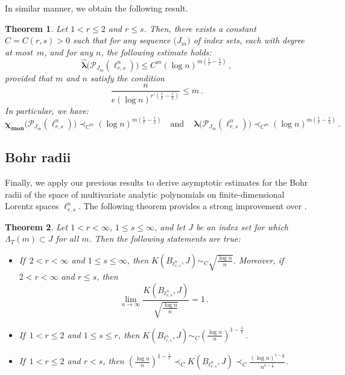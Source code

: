 \documentclass[12pt]{amsart}
\numberwithin{subsection}{section}
\newtheorem{theorem}{Theorem}[section]
\theoremstyle{definition}
\theoremstyle{remark}
\DeclareMathOperator{\mon}{mon}
\newcommand{\chimon}{\chi_{\mon}}
\begin{document}
In similar manner, we obtain the following result.


\begin{theorem} \label{proj lorentz s>r, big m}
Let $1 < r \leq 2$ and $r \leq s$. 
Then, there exists a constant $C=C(r, s)>0$ such that for any sequence $\big(J_m\big)$
of index sets, each with degree at most~$m$, and for any $n$, the following estimate holds{\rm:}
\[
\widehat{\boldsymbol{\lambda}}\big(\mathcal P_{J_m}(\ell_{r,s}^n)\big) \le C^m (\log n)^{m(\frac{1}{r} - \frac{1}{s})}\,,
\]
provided that $m$ and $n$ satisfy the condition
\[
\frac{n}{e(\log n)^{r'(\frac1{r}-\frac1{s})}}\le m\,.
\]
In particular, we have{\rm:}
\[
\boldsymbol{\chimon}\big(\mathcal P_{J_m}(\ell_{r,s}^n)\big) \prec_{C^m}  (\log n)^{m(\frac{1}{r} - \frac{1}{s})}  \quad \textrm{and}\quad\,
{\boldsymbol{\lambda}}\big(\mathcal P_{J_m}(\ell_{r,s}^n)\big) \prec_{C^m} (\log n)^{m(\frac{1}{r} - \frac{1}{s})}\,.
\]
\end{theorem}


\subsection{Bohr radii} \label{section: main bohr radii}

Finally, we apply our previous results to derive asymptotic estimates for the Bohr radii of the space of multivariate analytic
polynomials on finite-dimensional Lorentz spaces $\ell_{r,s}^n$. The following theorem provides a strong improvement over
\cite[Corollary 10]{defant2018bohr}.


\begin{theorem}\label{thm: main bohr radii}
Let $1<r<\infty$, $1 \le s \le \infty $, and let $J$ be an index set for which  $\Lambda_{T}(m) \subset J$ for all $m$.
Then the following statements are true{\rm:}
\begin{itemize}
\item[(i)] If\, $2 < r < \infty$ and $1 \le s \le \infty$, then $K(B_{\ell_{r,s}^n},J)\sim_C \sqrt{\frac{\log n}{n}}$. Moreover,
if\, $2 < r < \infty$ and $r \le s $, then
\[
\lim_{n \to \infty} \frac{K(B_{\ell_{r,s}^n},J)}{\sqrt{\frac{\log n}{n}}} = 1\,.
\]
\item[(ii)] If\, $1 < r \le 2$ and  $1 \le s \le r$, then  $K(B_{\ell_{r,s}^n},J)\sim_C \left( \frac{\log n}{n} \right)^{1-\frac{1}{r}}$\,.
\item[(iii)] If\, $1<r\le2$ and $r < s $, then  $\left( \frac{\log n}{n} \right)^{1-\frac{1}{r}}
\prec_C K(B_{\ell_{r,s}^n},J) \prec_C\frac{(\log n)^{1-\frac{1}{s}}}{n^{1-\frac{1}{r}}}$.
\end{itemize}
\end{theorem}
\end{document}
